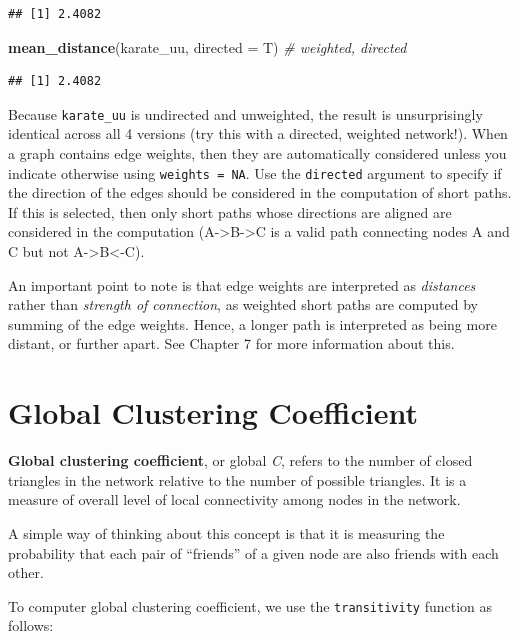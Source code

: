 \documentclass[
]{book}
\newenvironment{Shaded}{\begin{snugshade}}{\end{snugshade}}
\newcommand{\AttributeTok}[1]{\textcolor[rgb]{0.13,0.29,0.53}{#1}}
\newcommand{\CommentTok}[1]{\textcolor[rgb]{0.56,0.35,0.01}{\textit{#1}}}
\newcommand{\FunctionTok}[1]{\textcolor[rgb]{0.13,0.29,0.53}{\textbf{#1}}}
\newcommand{\NormalTok}[1]{#1}
\begin{document}
\begin{verbatim}
## [1] 2.4082
\end{verbatim}

\begin{Shaded}
\begin{Highlighting}[]
\FunctionTok{mean\_distance}\NormalTok{(karate\_uu, }\AttributeTok{directed =}\NormalTok{ T) }\CommentTok{\# weighted, directed }
\end{Highlighting}
\end{Shaded}

\begin{verbatim}
## [1] 2.4082
\end{verbatim}

Because \texttt{karate\_uu} is undirected and unweighted, the result is unsurprisingly identical across all 4 versions (try this with a directed, weighted network!). When a graph contains edge weights, then they are automatically considered unless you indicate otherwise using \texttt{weights\ =\ NA}. Use the \texttt{directed} argument to specify if the direction of the edges should be considered in the computation of short paths. If this is selected, then only short paths whose directions are aligned are considered in the computation (A-\textgreater B-\textgreater C is a valid path connecting nodes A and C but not A-\textgreater B\textless-C).

An important point to note is that edge weights are interpreted as \emph{distances} rather than \emph{strength of connection}, as weighted short paths are computed by summing of the edge weights. Hence, a longer path is interpreted as being more distant, or further apart. See Chapter 7 for more information about this.

\section{Global Clustering Coefficient}\label{global-clustering-coefficient}

\textbf{Global clustering coefficient}, or global \emph{C}, refers to the number of closed triangles in the network relative to the number of possible triangles. It is a measure of overall level of local connectivity among nodes in the network.

A simple way of thinking about this concept is that it is measuring the probability that each pair of ``friends'' of a given node are also friends with each other.

To computer global clustering coefficient, we use the \texttt{transitivity} function as follows:
\end{document}
